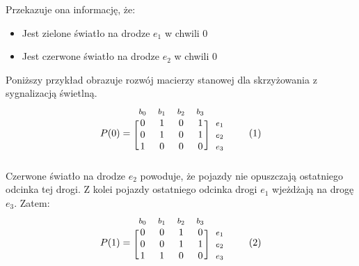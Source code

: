 \documentclass[12pt]{book}
\newcommand\addtag{\refstepcounter{equation}
\tag{\theequation}}
\begin{document}
Przekazuje ona informację, że:
\begin{itemize}
\item Jest zielone światło na drodze $e_1$ w chwili 0 
\item Jest czerwone światło na drodze $e_2$ w chwili 0
\end{itemize}

Poniższy przykład obrazuje rozwój macierzy stanowej dla skrzyżowania z sygnalizacją świetlną.
\begin{equation*}
  P(0)=
  \begin{blockarray}{*{4}{c} l}
    \begin{block}{*{4}{>{$\footnotesize}c<{$}} l}
      $b_0$ & $b_1$ & $b_2$ & $b_3$ \\
    \end{block}
    \begin{block}{[*{4}{c}]>{$\footnotesize}l<{$}}
       0 & 1 & 0 & 1 & $e_1$ \\
       0 & 1 & 0 & 1 & $e_2$ \\
       1 & 0 & 0 & 0 & $e_3$ \\
    \end{block}
  \end{blockarray} \addtag \label{skrz_1_zmiennaStanu_0_sygnalizacja}
\end{equation*}
Czerwone światło na drodze $e_2$ powoduje, że pojazdy nie opuszczają ostatniego odcinka tej drogi. Z kolei pojazdy ostatniego odcinka drogi $e_1$ wjeżdżają na drogę $e_3$. Zatem: 
\begin{equation*}
  P(1)=
  \begin{blockarray}{*{4}{c} l}
    \begin{block}{*{4}{>{$\footnotesize}c<{$}} l}
      $b_0$ & $b_1$ & $b_2$ & $b_3$ \\
    \end{block}
    \begin{block}{[*{4}{c}]>{$\footnotesize}l<{$}}
       0 & 0 & 1 & 0 & $e_1$ \\
       0 & 0 & 1 & 1 & $e_2$ \\
       1 & 1 & 0 & 0 & $e_3$ \\
    \end{block}
  \end{blockarray} \addtag \label{skrz_1_zmiennaStanu_0_sygnalizacja}
\end{equation*}
\end{document}
